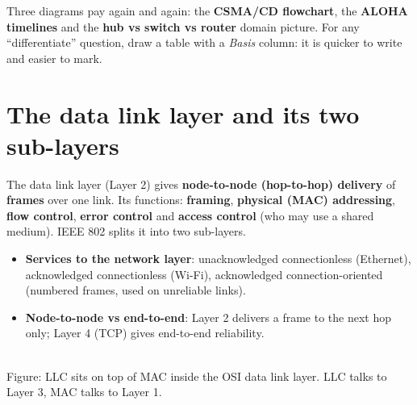 \documentclass[10pt]{article}
\begin{document}
\begin{examtip}
Three diagrams pay again and again: the \textbf{CSMA/CD flowchart}, the \textbf{ALOHA timelines} and the \textbf{hub vs switch vs router} domain picture.
For any ``differentiate'' question, draw a table with a \emph{Basis} column: it is quicker to write and easier to mark.
\end{examtip}

\section{The data link layer and its two sub-layers}

The data link layer (Layer 2) gives \textbf{node-to-node (hop-to-hop) delivery} of \textbf{frames} over one link.
Its functions: \textbf{framing}, \textbf{physical (MAC) addressing}, \textbf{flow control}, \textbf{error control} and \textbf{access control} (who may use a shared medium).
IEEE 802 splits it into two sub-layers.
\begin{itemize}
\item \textbf{Services to the network layer}: unacknowledged connectionless (Ethernet), acknowledged connectionless (Wi-Fi), acknowledged connection-oriented (numbered frames, used on unreliable links).
\item \textbf{Node-to-node vs end-to-end}: Layer 2 delivers a frame to the next hop only; Layer 4 (TCP) gives end-to-end reliability.
\end{itemize}

\begin{center}
\\
{\scriptsize\color{midgrey}Figure: LLC sits on top of MAC inside the OSI data link layer. LLC talks to Layer 3, MAC talks to Layer 1.}
\end{center}
\end{document}
